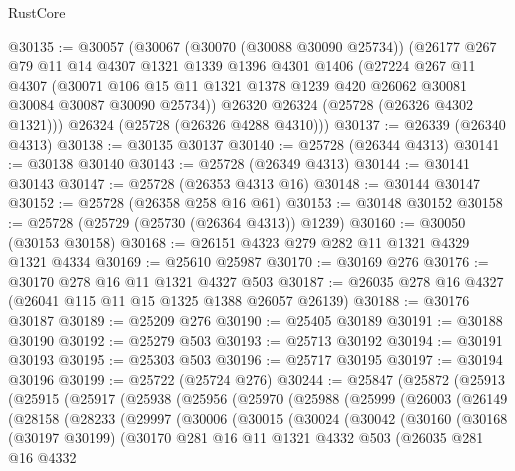 \begin{lexlean}{RustCore}
\begin{coremodule}
@30135 := @30057
    (@30067
      (@30070 (@30088 @30090 @25734))
      (@26177
        @267
        @79
        @11
        @14
        @4307
        @1321
        @1339
        @1396
        @4301
        @1406
        (@27224
          @267
          @11
          @4307
          (@30071 @106 @15 @11 @1321 @1378 @1239 @420 @26062 @30081 @30084 @30087 @30090 @25734))
        @26320
        @26324
        (@25728 (@26326 @4302 @1321)))
      @26324
      (@25728 (@26326 @4288 @4310)))
@30137 := @26339 (@26340 @4313)
@30138 := @30135 @30137
@30140 := @25728 (@26344 @4313)
@30141 := @30138 @30140
@30143 := @25728 (@26349 @4313)
@30144 := @30141 @30143
@30147 := @25728 (@26353 @4313 @16)
@30148 := @30144 @30147
@30152 := @25728 (@26358 @258 @16 @61)
@30153 := @30148 @30152
@30158 := @25728 (@25729 (@25730 (@26364 @4313)) @1239)
@30160 := @30050 (@30153 @30158)
@30168 := @26151 @4323 @279 @282 @11 @1321 @4329 @1321 @4334
@30169 := @25610 @25987
@30170 := @30169 @276
@30176 := @30170 @278 @16 @11 @1321 @4327 @503
@30187 := @26035 @278 @16 @4327 (@26041 @115 @11 @15 @1325 @1388 @26057 @26139)
@30188 := @30176 @30187
@30189 := @25209 @276
@30190 := @25405 @30189
@30191 := @30188 @30190
@30192 := @25279 @503
@30193 := @25713 @30192
@30194 := @30191 @30193
@30195 := @25303 @503
@30196 := @25717 @30195
@30197 := @30194 @30196
@30199 := @25722 (@25724 @276)
@30244 := @25847
    (@25872
      (@25913
        (@25915
          (@25917
            (@25938
              (@25956
                (@25970
                  (@25988
                    (@25999
                      (@26003
                        (@26149
                          (@28158
                            (@28233
                              (@29997
                                (@30006
                                  (@30015
                                    (@30024
                                      (@30042
                                        (@30160
                                          (@30168
                                            (@30197 @30199)
                                            (@30170
                                              @281
                                              @16
                                              @11
                                              @1321
                                              @4332
                                              @503
                                              (@26035
                                                @281
                                                @16
                                                @4332

\end{coremodule}
\end{lexlean}
